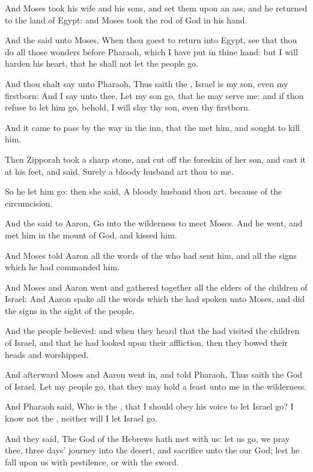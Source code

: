 \Verse And Moses took his wife and his sons, and set them upon an ass, and he returned to the land of Egypt: and Moses took the rod of God in his hand.

\Verse And the \LORD said unto Moses, When thou goest to return into Egypt, see that thou do all those wonders before Pharaoh, which I have put in thine hand: but I will harden his heart, that he shall not let the people go.

\Verse And thou shalt say unto Pharaoh, Thus saith the \LORD, Israel is my son, even my firstborn: \Verse And I say unto thee, Let my son go, that he may serve me: and if thou refuse to let him go, behold, I will slay thy son, even thy firstborn.

\Verse And it came to pass by the way in the inn, that the \LORD met him, and sought to kill him.

\Verse Then Zipporah took a sharp stone, and cut off the foreskin of her son, and cast it at his feet, and said, Surely a bloody husband art thou to me.

\Verse So he let him go: then she said, A bloody husband thou art, because of the circumcision.

\Verse And the \LORD said to Aaron, Go into the wilderness to meet Moses.  And he went, and met him in the mount of God, and kissed him.

\Verse And Moses told Aaron all the words of the \LORD who had sent him, and all the signs which he had commanded him.

\Verse And Moses and Aaron went and gathered together all the elders of the children of Israel: \Verse And Aaron spake all the words which the \LORD had spoken unto Moses, and did the signs in the sight of the people.

\Verse And the people believed: and when they heard that the \LORD had visited the children of Israel, and that he had looked upon their affliction, then they bowed their heads and worshipped.

\Chapter
\Verse And afterward Moses and Aaron went in, and told Pharaoh, Thus saith the \LORD God of Israel, Let my people go, that they may hold a feast unto me in the wilderness.

\Verse And Pharaoh said, Who is the \LORD, that I should obey his voice to let Israel go? I know not the \LORD, neither will I let Israel go.

\Verse And they said, The God of the Hebrews hath met with us: let us go, we pray thee, three days' journey into the desert, and sacrifice unto the \LORD our God; lest he fall upon us with pestilence, or with the sword.

